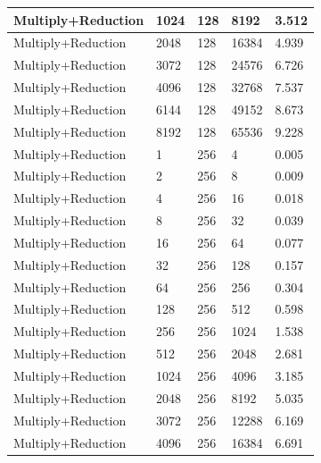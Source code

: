 \documentclass{article}
\begin{document}
\begin{longtable}{|l|l|l|l|l|}
Multiply+Reduction & 1024 & 128         & 8192              & 3.512             \\ \hline
Multiply+Reduction & 2048 & 128         & 16384             & 4.939             \\ \hline
Multiply+Reduction & 3072 & 128         & 24576             & 6.726             \\ \hline
Multiply+Reduction & 4096 & 128         & 32768             & 7.537             \\ \hline
Multiply+Reduction & 6144 & 128         & 49152             & 8.673             \\ \hline
Multiply+Reduction & 8192 & 128         & 65536             & 9.228             \\ \hline
Multiply+Reduction & 1    & 256         & 4                 & 0.005             \\ \hline
Multiply+Reduction & 2    & 256         & 8                 & 0.009             \\ \hline
Multiply+Reduction & 4    & 256         & 16                & 0.018             \\ \hline
Multiply+Reduction & 8    & 256         & 32                & 0.039             \\ \hline
Multiply+Reduction & 16   & 256         & 64                & 0.077             \\ \hline
Multiply+Reduction & 32   & 256         & 128               & 0.157             \\ \hline
Multiply+Reduction & 64   & 256         & 256               & 0.304             \\ \hline
Multiply+Reduction & 128  & 256         & 512               & 0.598             \\ \hline
Multiply+Reduction & 256  & 256         & 1024              & 1.538             \\ \hline
Multiply+Reduction & 512  & 256         & 2048              & 2.681             \\ \hline
Multiply+Reduction & 1024 & 256         & 4096              & 3.185             \\ \hline
Multiply+Reduction & 2048 & 256         & 8192              & 5.035             \\ \hline
Multiply+Reduction & 3072 & 256         & 12288             & 6.169             \\ \hline
Multiply+Reduction & 4096 & 256         & 16384             & 6.691             \\ \hline

\end{longtable}
\end{document}
